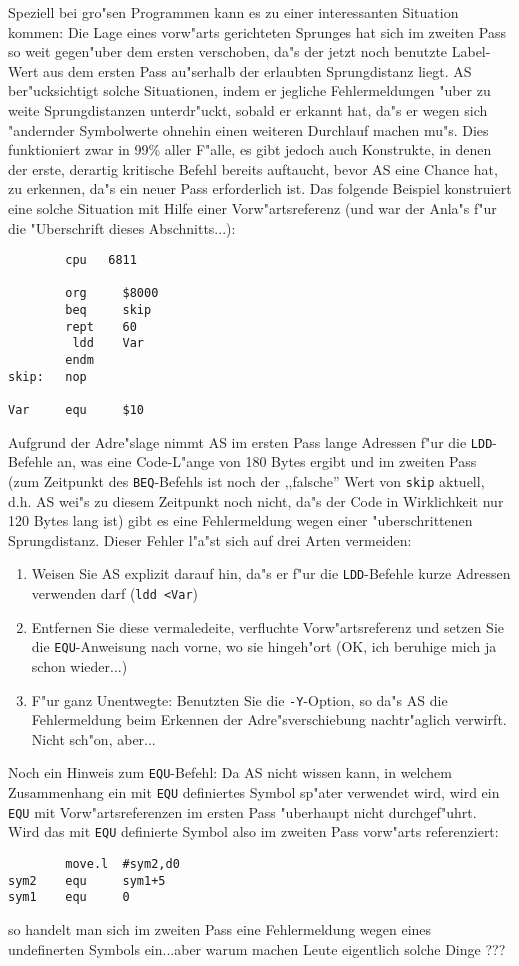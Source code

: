 \documentclass[12pt,a4paper,twoside]{report}
\newcommand{\tty}[1]{{\tt #1}}
\begin{document}
Speziell bei gro"sen Programmen kann es zu einer interessanten Situation
kommen: Die Lage eines vorw"arts gerichteten Sprunges hat sich
im zweiten Pass so weit gegen"uber dem ersten verschoben, da"s der
jetzt noch benutzte Label-Wert aus dem ersten Pass au"serhalb der
erlaubten Sprungdistanz liegt.  AS ber"ucksichtigt solche Situationen,
indem er jegliche Fehlermeldungen "uber zu weite Sprungdistanzen unterdr"uckt,
sobald er erkannt hat, da"s er wegen sich "andernder Symbolwerte ohnehin
einen weiteren Durchlauf machen mu"s.  Dies funktioniert zwar in 99\%
aller F"alle, es gibt jedoch auch Konstrukte, in denen der erste, derartig
kritische Befehl bereits auftaucht, bevor AS eine Chance hat, zu erkennen,
da"s ein neuer Pass erforderlich ist.  Das folgende Beispiel konstruiert
eine solche Situation mit Hilfe einer Vorw"artsreferenz (und war der
Anla"s f"ur die "Uberschrift dieses Abschnitts...):
\begin{verbatim}
        cpu   6811

        org     $8000
        beq     skip
        rept    60
         ldd    Var
        endm
skip:   nop

Var     equ     $10
\end{verbatim}
Aufgrund der Adre"slage nimmt AS im ersten Pass lange Adressen f"ur die
\tty{LDD}-Befehle an, was eine Code-L"ange von 180 Bytes ergibt und im
zweiten Pass (zum Zeitpunkt des \tty{BEQ}-Befehls ist noch der ,,falsche''
Wert von \tty{skip} aktuell, d.h. AS wei"s zu diesem Zeitpunkt noch nicht,
da"s der Code in Wirklichkeit nur 120 Bytes lang ist) gibt es eine
Fehlermeldung wegen einer "uberschrittenen Sprungdistanz.  Dieser Fehler
l"a"st sich auf drei Arten vermeiden:
\begin{enumerate}
\item{Weisen Sie AS explizit darauf hin, da"s er f"ur die \tty{LDD}-Befehle
      kurze Adressen verwenden darf (\tty{ldd <Var})}
\item{Entfernen Sie diese vermaledeite, verfluchte Vorw"artsreferenz und
      setzen Sie die \tty{EQU}-Anweisung nach vorne, wo sie hingeh"ort
      (OK, ich beruhige mich ja schon wieder...)}
\item{F"ur ganz Unentwegte: Benutzten Sie die \tty{-Y}-Option, so da"s AS die
      Fehlermeldung beim Erkennen der Adre"sverschiebung nachtr"aglich
      verwirft.  Nicht sch"on, aber...}
\end{enumerate}
Noch ein Hinweis zum \tty{EQU}-Befehl:  Da AS nicht wissen kann, in welchem
Zusammenhang ein mit \tty{EQU} definiertes Symbol sp"ater verwendet wird,
wird ein \tty{EQU} mit Vorw"artsreferenzen im ersten Pass "uberhaupt nicht
durchgef"uhrt.  Wird das mit \tty{EQU} definierte Symbol also im zweiten
Pass vorw"arts referenziert:
\begin{verbatim}
        move.l  #sym2,d0
sym2    equ     sym1+5
sym1    equ     0
\end{verbatim}
so handelt man sich im zweiten Pass eine Fehlermeldung wegen eines
undefinerten Symbols ein...aber warum machen Leute eigentlich solche
Dinge ???
\end{document}
